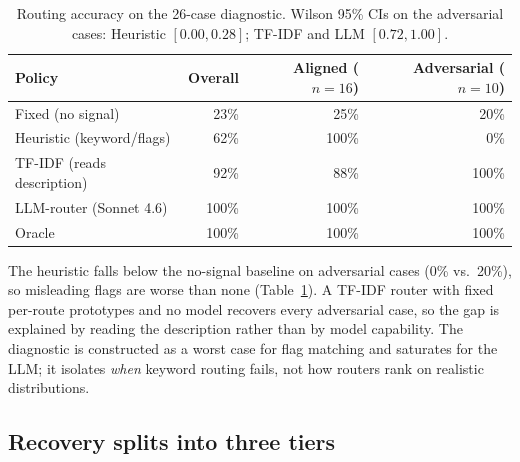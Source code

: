 \documentclass[11pt,a4paper]{article}
\begin{document}
\begin{table}[htbp]
  \centering
  \begin{tabularx}{\linewidth}{@{}Xrrr@{}}
    \toprule
    Policy & Overall & Aligned ($n{=}16$) & Adversarial ($n{=}10$) \\
    \midrule
    Fixed (no signal) & 23\% & 25\% & 20\% \\
    Heuristic (keyword/flags) & 62\% & 100\% & 0\% \\
    TF-IDF (reads description) & 92\% & 88\% & 100\% \\
    LLM-router (Sonnet 4.6) & 100\% & 100\% & 100\% \\
    Oracle & 100\% & 100\% & 100\% \\
    \bottomrule
  \end{tabularx}
  \caption{Routing accuracy on the 26-case diagnostic. Wilson 95\% CIs on the
  adversarial cases: Heuristic $[0.00, 0.28]$; TF-IDF and LLM $[0.72, 1.00]$.}
  \label{tab:exp1}
\end{table}

The heuristic falls below the no-signal baseline on adversarial cases (0\% vs.\
20\%), so misleading flags are worse than none (Table~\ref{tab:exp1}). A
TF-IDF router with fixed per-route prototypes and no model recovers every
adversarial case, so the gap is explained by reading the description rather than
by model capability. The diagnostic is constructed as a worst case for flag
matching and saturates for the LLM; it isolates \emph{when} keyword routing
fails, not how routers rank on realistic distributions.

\subsection{Recovery splits into three tiers}
\label{sec:exp2}
\end{document}
